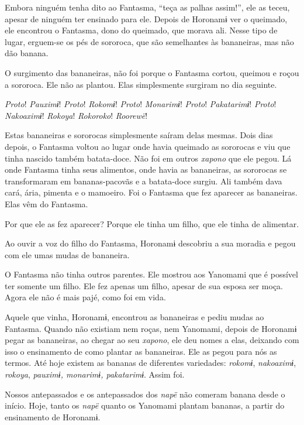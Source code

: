 Embora ninguém tenha dito ao Fantasma, ``teça as palhas assim!'', ele as
teceu, apesar de ninguém ter ensinado para ele. Depois de Horonamɨ ver o
queimado, ele encontrou o Fantasma, dono do queimado, que morava ali.
Nesse tipo de lugar, erguem-se os pés de sororoca, que são semelhantes
às bananeiras, mas não dão banana. 

O surgimento das bananeiras, não foi porque o Fantasma cortou, queimou e
roçou a sororoca. Ele não as plantou. Elas simplesmente surgiram no dia
seguinte. 

\textit{Proto}! \textit{Pauximɨ}! \textit{Proto}! \textit{Rokomɨ}! \textit{Proto}! \textit{Monarimɨ}!
\textit{Proto}! \textit{Pakatarimɨ}!
\textit{Proto}! \textit{Nakoaximɨ}! \textit{Rokoya}! \textit{Rokoroko}! \textit{Roorewë}! 

Estas bananeiras e sororocas simplesmente saíram delas mesmas. Dois dias depois, o Fantasma voltou ao lugar onde havia queimado as sororocas e viu que tinha nascido
também batata-doce. Não foi em outros \textit{xapono} que ele pegou. Lá onde
Fantasma tinha seus alimentos, onde havia as bananeiras, as sororocas se
transformaram em bananas-pacovãs e a batata-doce surgiu. Ali também dava
cará, ária, pimenta e o mamoeiro. Foi o Fantasma que fez aparecer as
bananeiras. Elas vêm do Fantasma. 

Por que ele as fez aparecer? Porque ele tinha um filho, que ele tinha de
alimentar. 

Ao ouvir a voz do filho do Fantasma, Horonamɨ descobriu a sua moradia e
pegou com ele umas mudas de bananeira. 

O Fantasma não tinha outros parentes. Ele mostrou aos Yanomami que é
possível ter somente um filho. Ele fez apenas um filho, apesar de sua
esposa ser moça. Agora ele não é mais pajé, como foi em vida. 

Aquele que vinha, Horonamɨ, encontrou as bananeiras e pediu mudas ao
Fantasma. Quando não existiam nem roças, nem Yanomami, depois de
Horonamɨ pegar as bananeiras, ao chegar ao seu \textit{xapono}, ele deu nomes a
elas, deixando com isso o ensinamento de como plantar as bananeiras. Ele
as pegou para nós as termos. Até hoje existem as bananas de diferentes
variedades: \textit{rokomɨ}, \textit{nakoaximɨ}, \textit{rokoya}, \textit{pauximɨ,
monarimɨ, pakatarimɨ}. Assim foi. 

Nossos antepassados e os antepassados dos \textit{napë} não comeram banana
desde o início. Hoje, tanto os \textit{napë} quanto os Yanomami plantam
bananas, a partir do ensinamento de Horonamɨ.

